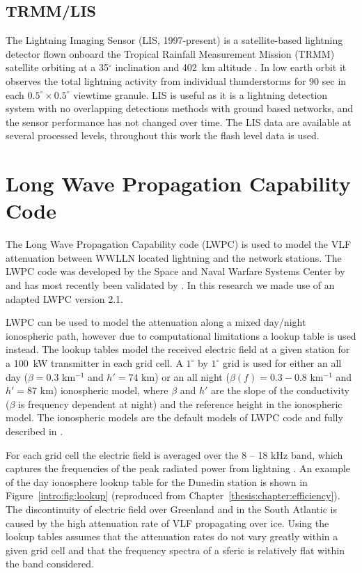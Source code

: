 \subsection{TRMM/LIS}


The Lightning Imaging Sensor (LIS, 1997-present) is a satellite-based lightning detector flown onboard the Tropical Rainfall Measurement Mission (TRMM) satellite orbiting at a 35$^\circ$ inclination and 402~km altitude \citep{Christian1999}.
In low earth orbit it observes the total lightning activity from individual thunderstorms for 90 sec in each $0.5^\circ \times 0.5^\circ$ viewtime granule.
LIS is useful as it is a lightning detection system with no overlapping detections methods with ground based networks, and the sensor performance has not changed over time.
The LIS data are available at several processed levels, throughout this work the flash level data is used.

\section{Long Wave Propagation Capability Code}

The Long Wave Propagation Capability code (LWPC) is used to model the VLF attenuation between WWLLN located lightning and the network stations.
The LWPC code was developed by the Space and Naval Warfare Systems Center by \citet{Ferguson1998} and has most recently been validated by \citet{McRae2000d, Thomson2011}.
In this research we made use of an adapted LWPC version 2.1.

LWPC can be used to model the attenuation along a mixed day/night ionospheric path, however due to computational limitations a lookup table is used instead.
The lookup tables model the received electric field at a given station for a 100~kW transmitter in each grid cell.
A $1^{\circ}$ by $1^{\circ}$ grid is used for either an all day ($\beta=0.3$ km$^{-1}$ and $h'=74$ km) or an all night ($\beta(f)=0.3-0.8$ km$^{-1}$ and $h'=87$ km) ionospheric model, where $\beta$ and $h'$ are the slope of the conductivity ($\beta$ is frequency dependent at night) and the reference height in the ionospheric model.
The ionospheric models are the default models of LWPC code and fully described in \citet{Ferguson1998}. 

For each grid cell the electric field is averaged over the 8 -- 18 kHz band, which captures the frequencies of the peak radiated power from lightning \citep{Volland1995}.
An example of the day ionosphere lookup table for the Dunedin station is shown in Figure~\ref{intro:fig:lookup} (reproduced from Chapter~\ref{thesis:chapter:efficiency}).
The discontinuity of electric field over Greenland and in the South Atlantic is caused by the high attenuation rate of VLF propagating over ice.
Using the lookup tables assumes that the attenuation rates do not vary greatly within a given grid cell and that the frequency spectra of a sferic is relatively flat within the band considered.

